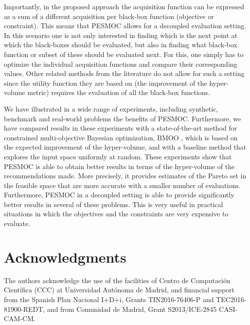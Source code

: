 \documentclass[review,preprint,12pt]{elsarticle}
\providecommand{\DIFaddbegin}{} %
\providecommand{\DIFaddend}{} %
\providecommand{\DIFdelbegin}{} %
\providecommand{\DIFdelend}{} %
\begin{document}
Importantly, in the proposed approach the acquisition function can be expressed
as a sum of a different acquisition per black-box function (objective or constraint).
This means that PESMOC allows for a decoupled evaluation setting. In this scenario one is 
not only interested in finding which is the next point at which the black-boxes should
be evaluated, but also in finding what black-box function or subset of these should be evaluated 
next. For this, one simply has to optimize the individual acquisition functions and compare their
corresponding values. Other related methods from the literature do not allow for such a setting
since the utility function they are based on (the improvement of the hyper-volume metric) requires 
the evaluation of all the black-box functions.

We have illustrated in a wide range of experiments, including synthetic, benchmark and real-world problems
the benefits of PESMOC. Furthermore, we have compared results in these experiments with
a state-of-the-art method for constrained multi-objective Bayesian optimization, BMOO \citep{feliot2015bayesian},
which is based on the expected improvement of the hyper-volume, and with a baseline method that explores the input 
space uniformly at random. These experiments show that PESMOC is able to obtain better results in 
terms of the hyper-volume of the recommendations made. More precisely, it provides estimates of the Pareto 
set in the feasible space that are more accurate with a smaller number of evaluations. Furthermore, PESMOC in a 
decoupled setting is able to provide significantly better results in several of these problems. This is very 
useful in practical situations in which the objectives and the constraints are very expensive to evaluate.

\section*{Acknowledgments}

{\small
The authors acknowledge the use of the facilities of Centro de Computaci\'on Cient\'ifica (CCC) at 
Universidad Aut\'onoma de Madrid, and financial support from the Spanish Plan Nacional I+D+i, 
Grants TIN2016-76406-P and TEC2016-81900-REDT, and from Comunidad de Madrid, Grant S2013/ICE-2845 CASI-CAM-CM. 
}

\DIFdelbegin %
\DIFdelend \DIFaddbegin 
\DIFaddend 


\end{document}
